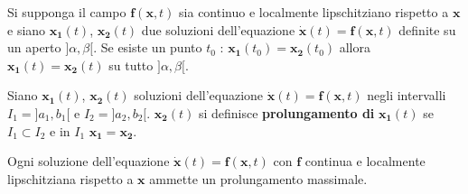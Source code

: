 \documentclass[10pt]{article}
\theoremstyle{plain}
\begin{document}
\begin{prop}
Si supponga il campo $\mathbf{f}(\mathbf{x}, t)$ sia continuo e localmente lipschitziano rispetto a $\mathbf{x}$ e siano $\mathbf{x_1}(t)$, $\mathbf{x_2}(t)$ due soluzioni dell'equazione $\dot{\mathbf{x}}(t) = \mathbf{f}(\mathbf{x}, t)$ definite su un aperto $]\alpha, \beta[$. Se esiste un punto $t_0$ : $\mathbf{x_1}(t_0) = \mathbf{x_2}(t_0)$ allora $\mathbf{x_1}(t) = \mathbf{x_2}(t)$ su tutto $]\alpha, \beta[$.
\end{prop} 

\begin{defin}
Siano $\mathbf{x_1}(t)$, $\mathbf{x_2}(t)$ soluzioni dell'equazione $\dot{\mathbf{x}}(t) = \mathbf{f}(\mathbf{x}, t)$ negli intervalli $I_1 = ]a_1, b_1[$ e $I_2 = ]a_2, b_2[$. $\mathbf{x_2}(t)$ si definisce \textbf{prolungamento di} $\mathbf{x_1}(t)$ se $I_1 \subset I_2$ e in $I_1$ $\mathbf{x_1} = \mathbf{x_2}$.
\end{defin}

\begin{ther}
Ogni soluzione dell'equazione $\dot{\mathbf{x}}(t) = \mathbf{f}(\mathbf{x}, t)$ con $\mathbf{f}$ continua e localmente lipschitziana rispetto a $\mathbf{x}$ ammette un prolungamento massimale.
\end{ther}
\end{document}
